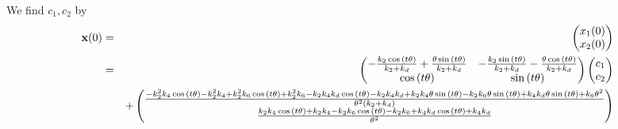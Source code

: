 \documentclass[11pt]{article}
\begin{document}
    We find $c_1, c_2$ by \begin{eqnarray*}
{\bf x} (0) & = & \begin{pmatrix} x_1 (0) \\ x_2 (0) \end{pmatrix} \\
& = & \begin{pmatrix}- \frac{k_{2} \cos{\left(t \theta \right)}}{k_{2} + k_{d}} + \frac{\theta \sin{\left(t \theta \right)}}{k_{2} + k_{d}} & - \frac{k_{2} \sin{\left(t \theta \right)}}{k_{2} + k_{d}} - \frac{\theta \cos{\left(t \theta \right)}}{k_{2} + k_{d}}\\\cos{\left(t \theta \right)} & \sin{\left(t \theta \right)}\end{pmatrix}  \begin{pmatrix} c_1 \\ c_2 \end{pmatrix} \\
&  & + \begin{pmatrix}\frac{- k_{2}^{2} k_{4} \cos{\left(t \theta \right)} - k_{2}^{2} k_{4} + k_{2}^{2} k_{6} \cos{\left(t \theta \right)} + k_{2}^{2} k_{6} - k_{2} k_{4} k_{d} \cos{\left(t \theta \right)} - k_{2} k_{4} k_{d} + k_{2} k_{4} \theta \sin{\left(t \theta \right)} - k_{2} k_{6} \theta \sin{\left(t \theta \right)} + k_{4} k_{d} \theta \sin{\left(t \theta \right)} + k_{6} \theta^{2}}{\theta^{2} \left(k_{2} + k_{d}\right)}\\\frac{k_{2} k_{4} \cos{\left(t \theta \right)} + k_{2} k_{4} - k_{2} k_{6} \cos{\left(t \theta \right)} - k_{2} k_{6} + k_{4} k_{d} \cos{\left(t \theta \right)} + k_{4} k_{d}}{\theta^{2}}\end{pmatrix}
\end{eqnarray*}
\end{document}
